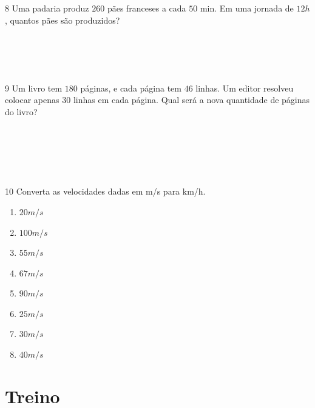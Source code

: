 \num{8} Uma padaria produz $260$ pães franceses a cada $50$ min. Em uma jornada
de $12 h$, quantos pães são produzidos?

\\
\\
\\
\\

\num{9} Um livro tem $180$ páginas, e cada página tem $46$ linhas. Um editor
resolveu colocar apenas $30$ linhas em cada página. Qual será a nova
quantidade de páginas do livro?

\\
\\
\\
\\
\\

\num{10} Converta as velocidades dadas em m/s para km/h.

\begin{multicols}{3}
\begin{enumerate}[itemsep=-3pt]
\item $20 m/s$
\item $100 m/s$
\item $55 m/s$
\item $67 m/s$
\item $90 m/s$
\item $25 m/s$
\item $30 m/s$
\item $40 m/s$
\end{enumerate}
\end{multicols}


\section{Treino}

